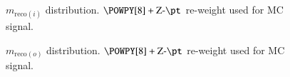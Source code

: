 \begin{figure}[h!tbp]
	\centering
	\hfill
	\caption{$m_{\text{reco}(i)}$ distribution. $\POWPY[8]+\text{Z-}\pt$ re-weight used for MC signal.}
	\label{AFig3P}
\end{figure} 

\begin{figure}[h!tbp]
	\centering
	\hfill
	\caption{$m_{\text{reco}(o)}$ distribution. $\POWPY[8]+\text{Z-}\pt$ re-weight used for MC signal.}
	\label{AFig4P}
\end{figure} 

